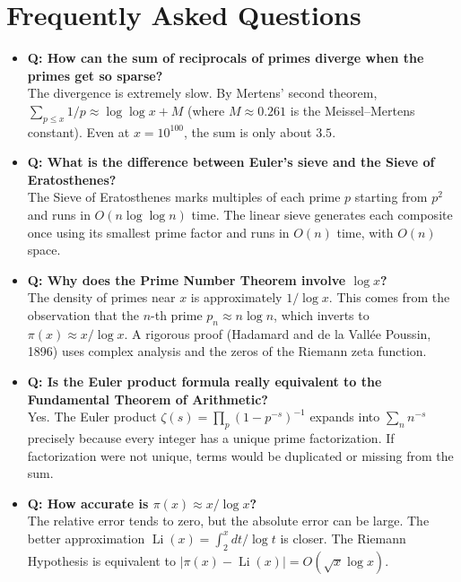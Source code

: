 \section{Frequently Asked Questions}

\begin{itemize}
\item \textbf{Q: How can the sum of reciprocals of primes diverge when the primes get so sparse?} \\
The divergence is extremely slow. By Mertens' second theorem, $\sum_{p \le x} 1/p \approx \log\log x + M$ (where $M \approx 0.261$ is the Meissel--Mertens constant). Even at $x = 10^{100}$, the sum is only about $3.5$.

\item \textbf{Q: What is the difference between Euler's sieve and the Sieve of Eratosthenes?} \\
The Sieve of Eratosthenes marks multiples of each prime $p$ starting from $p^2$ and runs in $O(n\log\log n)$ time. The linear sieve generates each composite once using its smallest prime factor and runs in $O(n)$ time, with $O(n)$ space.

\item \textbf{Q: Why does the Prime Number Theorem involve $\log x$?} \\
The density of primes near $x$ is approximately $1/\log x$. This comes from the observation that the $n$-th prime $p_n \approx n \log n$, which inverts to $\pi(x) \approx x/\log x$. A rigorous proof (Hadamard and de la Vall\'{e}e Poussin, 1896) uses complex analysis and the zeros of the Riemann zeta function.

\item \textbf{Q: Is the Euler product formula really equivalent to the Fundamental Theorem of Arithmetic?} \\
Yes. The Euler product $\zeta(s) = \prod_p (1 - p^{-s})^{-1}$ expands into $\sum_n n^{-s}$ precisely because every integer has a unique prime factorization. If factorization were not unique, terms would be duplicated or missing from the sum.

\item \textbf{Q: How accurate is $\pi(x) \approx x/\log x$?} \\
The relative error tends to zero, but the absolute error can be large. The better approximation $\operatorname{Li}(x) = \int_2^x dt/\log t$ is closer. The Riemann Hypothesis is equivalent to $|\pi(x) - \operatorname{Li}(x)| = O(\sqrt{x} \log x)$.


\end{itemize}
